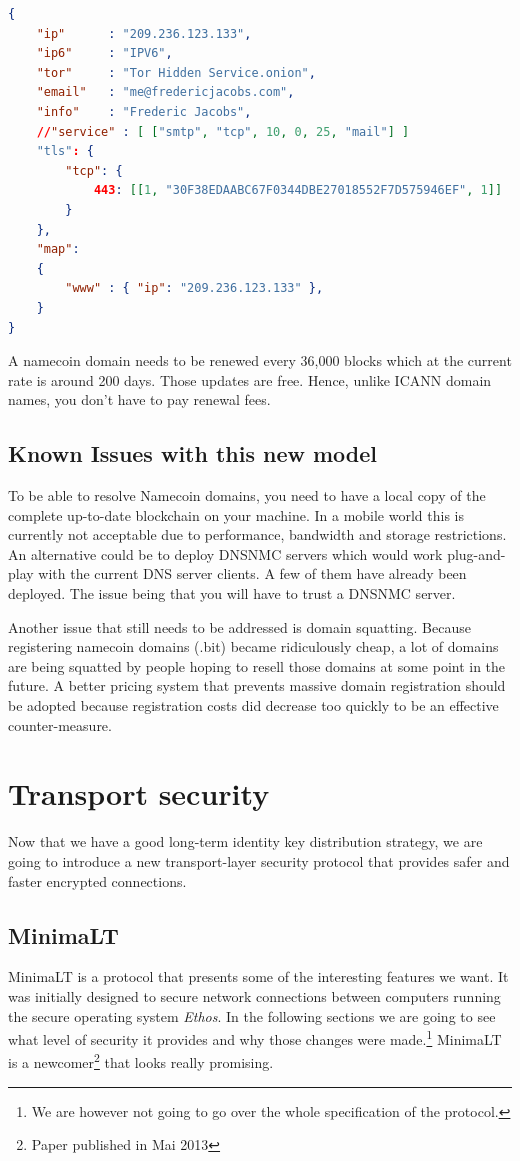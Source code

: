 \documentclass{vldb}
\begin{document}
\begin{lstlisting}[language=json,firstnumber=1]
{
    "ip"      : "209.236.123.133",
    "ip6"     : "IPV6",
    "tor"     : "Tor Hidden Service.onion",
    "email"   : "me@fredericjacobs.com",
    "info"    : "Frederic Jacobs",
    //"service" : [ ["smtp", "tcp", 10, 0, 25, "mail"] ]
    "tls": {
        "tcp": {
            443: [[1, "30F38EDAABC67F0344DBE27018552F7D575946EF", 1]]
        }
    },
    "map":
    {
        "www" : { "ip": "209.236.123.133" },
    }
}
\end{lstlisting}

A namecoin domain needs to be renewed every 36,000 blocks which at the current rate is around 200 days. Those updates are free. Hence, unlike ICANN domain names, you don't have to pay renewal fees.

\subsection{Known Issues with this new model}

To be able to resolve Namecoin domains, you need to have a local copy  of the complete up-to-date blockchain on your machine. In a mobile world this is currently not acceptable due to performance, bandwidth and storage restrictions. An alternative could be to deploy DNSNMC servers which would work plug-and-play with the current DNS server clients. A few of them have already been deployed. The issue being that you will have to trust a DNSNMC server.

Another issue that still needs to be addressed is domain squatting. Because registering namecoin domains (.bit) became ridiculously cheap, a lot of domains are being squatted by people hoping to resell those domains at some point in the future. A better pricing system that prevents massive domain registration should be adopted because registration costs did decrease too quickly to be an effective counter-measure.

\section{Transport security}


Now that we have a good long-term identity key distribution strategy, we are going to introduce a new transport-layer security protocol that provides safer and faster encrypted connections.
\subsection{MinimaLT}
MinimaLT\cite{MinimaLT} is a protocol that presents some of the interesting features we want. It was initially designed to secure network connections between computers running the secure operating system \emph{Ethos}. In the following sections we are going to see what level of security it provides and why those changes were made.\footnote{We are however not going to go over the whole specification of the protocol.} MinimaLT is a newcomer\footnote{Paper published in Mai 2013} that looks really promising.
\end{document}
